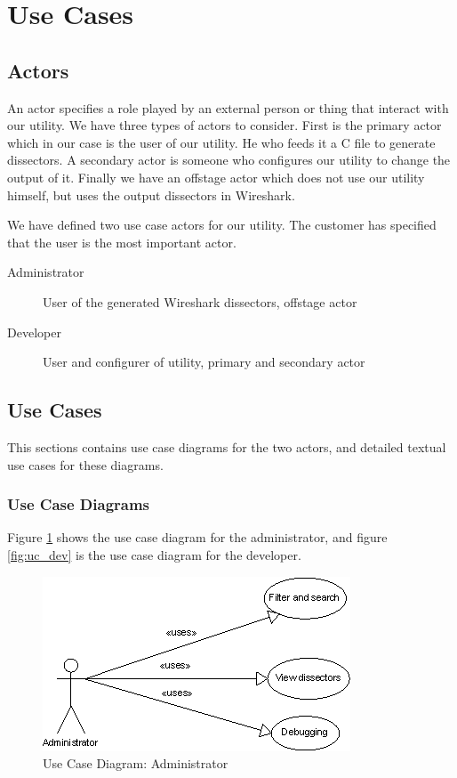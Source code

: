 \section{Use Cases}
\label{sec:usecases}

\subsection{Actors}
An actor specifies a role played by an external person or thing that interact
with our utility. We have three types of actors to consider. First is the
primary actor which in our case is the user of our utility. He who feeds it a
C file to generate dissectors. A secondary actor is someone who configures our
utility to change the output of it. Finally we have an offstage actor which
does not use our utility himself, but uses the output dissectors in Wireshark.

We have defined two use case actors for our utility. The customer has
specified that the user is the most important actor.
\begin{description}
	\item[Administrator] User of the generated Wireshark dissectors, offstage actor
	\item[Developer] User and configurer of utility, primary and secondary actor
\end{description}

\subsection{Use Cases}
This sections contains use case diagrams for the two actors, and detailed textual use cases for these diagrams.
\subsubsection{Use Case Diagrams}
Figure \ref{fig:uc_adm} shows the use case diagram for the administrator, and figure \ref{fig:uc_dev} is the use case diagram for the developer.
\begin{figure}[here]
\includegraphics[scale=1]{./planning/img/administrator.png}
\caption{Use Case Diagram: Administrator}
\label{fig:uc_adm}
\end{figure}

